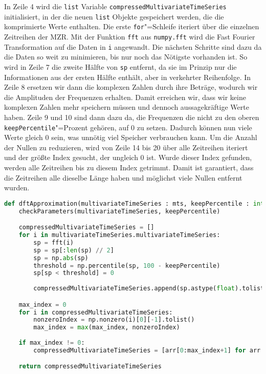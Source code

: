 In Zeile 4 wird die \lstinline|list| Variable \lstinline|compressedMultivariateTimeSeries| initialisiert, in der die neuen \lstinline|list| Objekte gespeichert werden, die die komprimierte Werte enthalten. Die erste \lstinline|for|"=Schleife iteriert über die einzelnen Zeitreihen der \ac{MZR}. Mit der Funktion \lstinline|fft| aus \lstinline|numpy.fft| wird die Fast Fourier Transformation auf die Daten in \lstinline|i| angewandt. Die nächsten Schritte sind dazu da die Daten so weit zu minimieren, bis nur noch das Nötigste vorhanden ist. So wird in Zeile 7 die zweite Hälfte von \lstinline|sp| entfernt, da sie im Prinzip nur die Informationen aus der ersten Hälfte enthält, aber in verkehrter Reihenfolge. In Zeile 8 ersetzen wir dann die komplexen Zahlen durch ihre Beträge, wodurch wir die Amplituden der Frequenzen erhalten. Damit erreichen wir, dass wir keine komplexen Zahlen mehr speichern müssen und dennoch aussagekräftige Werte haben. Zeile 9 und 10 sind dann dazu da, die Frequenzen die nicht zu den oberen \lstinline|keepPercentile|"=Prozent gehören, auf 0 zu setzen. Dadurch können nun viele Werte gleich 0 sein, was unnötig viel Speicher verbrauchen kann. Um die Anzahl der Nullen zu reduzieren, wird von Zeile 14 bis 20 über alle Zeitreihen iteriert und der größte Index gesucht, der ungleich 0 ist. Wurde dieser Index gefunden, werden alle Zeitreihen bis zu diesem Index getrimmt. Damit ist garantiert, dass die Zeitreihen alle dieselbe Länge haben und möglichst viele Nullen entfernt wurden.
\begin{lstlisting}[caption=Stückweise polynomielle Approximation, label=lst:diskretefouriertransformation, style=Python, language=Python]
def dftApproximation(multivariateTimeSeries : mts, keepPercentile : int):
    checkParameters(multivariateTimeSeries, keepPercentile)

    compressedMultivariateTimeSeries = []
    for i in multivariateTimeSeries.multivariateTimeSeries:
        sp = fft(i)
        sp = sp[:len(sp) // 2]
        sp = np.abs(sp)
        threshold = np.percentile(sp, 100 - keepPercentile)
        sp[sp < threshold] = 0
        
        compressedMultivariateTimeSeries.append(sp.astype(float).tolist())

    max_index = 0
    for i in compressedMultivariateTimeSeries:
        nonzeroIndex = np.nonzero(i)[0][-1].tolist()
        max_index = max(max_index, nonzeroIndex)
        
    if max_index != 0:
        compressedMultivariateTimeSeries = [arr[0:max_index+1] for arr in compressedMultivariateTimeSeries]

    return compressedMultivariateTimeSeries
\end{lstlisting}
